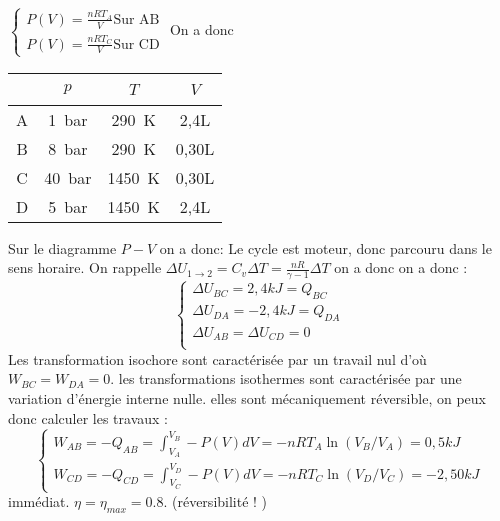 \begin{Answer}
		\Question $\begin{cases}
		P(V) = \frac{nRT_A}{V} \text{Sur AB}\\
		P(V) = \frac{nRT_C}{V} \text{Sur CD}
		\end{cases}$
		On a donc
		\begin{center}
			\begin{tabular}{|c|c|c|c|}
				~ & $p$			& $T$   	& $V$ \\ \hline
				A & \SI{1}{bar}	&\SI{290}{K}& 2,4L \\ \hline
				B & \SI{8}{bar}	&\SI{290}{K}& 0,30L \\ \hline
				C & \SI{40}{bar}&\SI{1450}{K}& 0,30L\\ \hline
				D & \SI{5}{bar} &\SI{1450}{K}& 2,4L \\ \hline
			\end{tabular}
		\end{center}

		Sur le diagramme $P-V$ on a donc:
		\Question Le cycle est moteur, donc parcouru dans le sens horaire.
		\Question On rappelle $\Delta U_{1\to2} = C_v \Delta T =\frac{nR}{\gamma -1} \Delta T$ on a donc 
		on a donc : \[\begin{cases}
		\Delta U_{BC} = 2,4 kJ = Q_{BC}\\
		\Delta U_{DA} = -2,4 kJ= Q_{DA}\\
		\Delta U_{AB} = \Delta U_{CD} = 0 \\
		\end{cases}\]
		Les transformation isochore sont caractérisée par un travail nul d'où $W_{BC} =W_{DA}=0$.
		les transformations isothermes sont caractérisée par une variation d'énergie interne nulle. elles sont mécaniquement réversible, on peux donc calculer les travaux :
		\[\begin{cases}
		W_{AB}= -Q_{AB} = \int_{V_A}^{V_B} -P(V)dV = -nRT_A\ln(V_B/V_A) = 0,5kJ\\
		W_{CD}= -Q_{CD} = \int_{V_C}^{V_D} -P(V)dV = -nRT_C\ln(V_D/V_C) = -2,50kJ
		\end{cases}\]
		\Question immédiat.
		\Question $\eta=\eta_{max} = 0.8$. (réversibilité ! )
\end{Answer}
